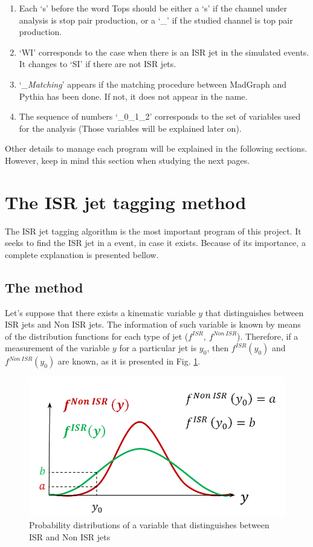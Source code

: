 \documentclass[12pt, oneside]{book}              %
\begin{document}
\begin{enumerate}
	\item Each \textquoteleft s' before the word Tops should be either
	a \textquoteleft s' if the channel under analysis is stop pair production, or a 
	\textquoteleft \_' if the studied channel is top pair production.
	\item \textquoteleft WI' corresponds to the case when there is an ISR jet in the
	simulated events. It changes to \textquoteleft SI' if there are not ISR jets.
	\item \textquoteleft \textit{\_Matching}' appears if the matching procedure between
	MadGraph and Pythia has been done. If not, it does not appear in the name.
	\item The sequence of numbers \textquoteleft \_0\_1\_2' corresponds to the set of
	variables used for the analysis (Those variables will be explained later on).
\end{enumerate}

Other details to manage each program will be explained in the following sections.
However, keep in mind this section when studying the next pages.

\section{The ISR jet tagging method} \label{sec:Method}

The ISR jet tagging algorithm is the most important program of this project. It
seeks to find the ISR jet in a event, in case it exists. Because of its importance,
a complete explanation is presented bellow.

\subsection{The method} \label{subsec:Method}

Let's suppose that there exists a kinematic variable $y$ that distinguishes between ISR jets and Non
ISR jets. The information of such variable is known by means of the distribution functions for each 
type of jet ($f^{ISR},\ f^{Non\ ISR}$). Therefore, if a measurement of the variable $y$ for a
particular jet is $y_0$, then $f^{ISR}(y_0)$ and $f^{Non\ ISR}(y_0)$ are known, as it is presented 
in Fig. \ref{fig:Prob_ISR_Non}.

\begin{figure}[h]
	\centering
	\includegraphics[width=0.5\linewidth]{./Imags_Doc/Prob_ISR_Non}
	\caption[Probability distributions ISR - Non ISR]{Probability distributions of a variable that distinguishes between ISR and Non ISR jets}
	\label{fig:Prob_ISR_Non}
\end{figure}
\end{document}
